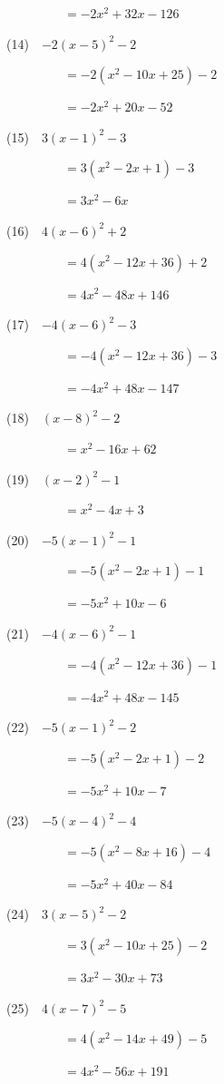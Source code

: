 \documentclass[a4j,twocolumn,10pt,fleqn]{jarticle}
\begin{document}
~~~~~~~~~$=-2x^2 +32x-126$

(14)~~$-2(x-5)^2-2$

~~~~~~~~~$=-2(x^2-10x +25)-2$

~~~~~~~~~$=-2x^2 +20x-52$

(15)~~$3(x-1)^2-3$

~~~~~~~~~$=3(x^2-2x +1)-3$

~~~~~~~~~$=3x^2-6x$

(16)~~$4(x-6)^2 +2$

~~~~~~~~~$=4(x^2-12x +36) +2$

~~~~~~~~~$=4x^2-48x +146$

(17)~~$-4(x-6)^2-3$

~~~~~~~~~$=-4(x^2-12x +36)-3$

~~~~~~~~~$=-4x^2 +48x-147$

(18)~~$(x-8)^2-2$

~~~~~~~~~$=x^2-16x +62$

(19)~~$(x-2)^2-1$

~~~~~~~~~$=x^2-4x +3$

(20)~~$-5(x-1)^2-1$

~~~~~~~~~$=-5(x^2-2x +1)-1$

~~~~~~~~~$=-5x^2 +10x-6$

(21)~~$-4(x-6)^2-1$

~~~~~~~~~$=-4(x^2-12x +36)-1$

~~~~~~~~~$=-4x^2 +48x-145$

(22)~~$-5(x-1)^2-2$

~~~~~~~~~$=-5(x^2-2x +1)-2$

~~~~~~~~~$=-5x^2 +10x-7$

(23)~~$-5(x-4)^2-4$

~~~~~~~~~$=-5(x^2-8x +16)-4$

~~~~~~~~~$=-5x^2 +40x-84$

(24)~~$3(x-5)^2-2$

~~~~~~~~~$=3(x^2-10x +25)-2$

~~~~~~~~~$=3x^2-30x +73$

(25)~~$4(x-7)^2-5$

~~~~~~~~~$=4(x^2-14x +49)-5$

~~~~~~~~~$=4x^2-56x +191$
\end{document}
